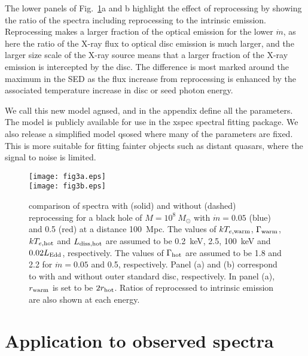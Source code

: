 \documentclass[a4paper,fleqn,usenatbib]{mnras}
\begin{document}
The lower panels of Fig.~\ref{fig:reprocess}a and b highlight the effect of
reprocessing by showing the ratio of the spectra including
reprocessing to the intrinsic emission.  Reprocessing makes a 
larger fraction of the optical emission for the lower $\dot{m}$, as
here the ratio of the X-ray flux to optical disc emission is much
larger, and the larger size scale of the X-ray source means that a
larger fraction of the X-ray emission is intercepted by the disc. The
difference is most marked around the maximum in the SED as the flux
increase from reprocessing is enhanced by the associated temperature
increase in disc or seed photon energy.

We call this new model {\sc agnsed}, and in the appendix define all
the parameters. 
The model is publicly available for use in the 
{\sc xspec} spectral fitting package. 
We also release a simplified model {\sc qsosed} where many of the parameters are fixed. 
This is more suitable for fitting fainter objects such as distant quasars, where the signal to noise is limited.

\begin{figure}
\begin{center}
	\texttt{[image: fig3a.eps]}\\
	\texttt{[image: fig3b.eps]}
\end{center}
\caption{comparison of spectra with
(solid) and without (dashed) reprocessing for a black hole of $M=10^8~M_\odot$ with $\dot{m}=0.05$
(blue) and 0.5 (red) at a distance 100~Mpc. 
The values of $kT_{e, {\rm warm}}$, $\Gamma_{\rm warm}$, $kT_{e, {\rm hot}}$ and 
$L_{\rm diss, hot}$ are assumed to be 0.2~keV, 2.5, 100~keV and $0.02L_{\rm Edd}$, respectively. The values of 
$\Gamma_{\rm hot}$ are assumed to be 1.8 and 2.2 for 
$\dot{m}=0.05$ and 0.5, respectively. 
Panel (a) and (b) correspond to with and without outer standard disc, respectively. 
In panel (a), $r_{\rm warm}$ is set to be $2r_{\rm hot}$.
Ratios of reprocessed
to intrinsic emission are also shown at each energy. }
\label{fig:reprocess}
\end{figure}

\section{Application to observed spectra}
\label{sec:application}
\end{document}
